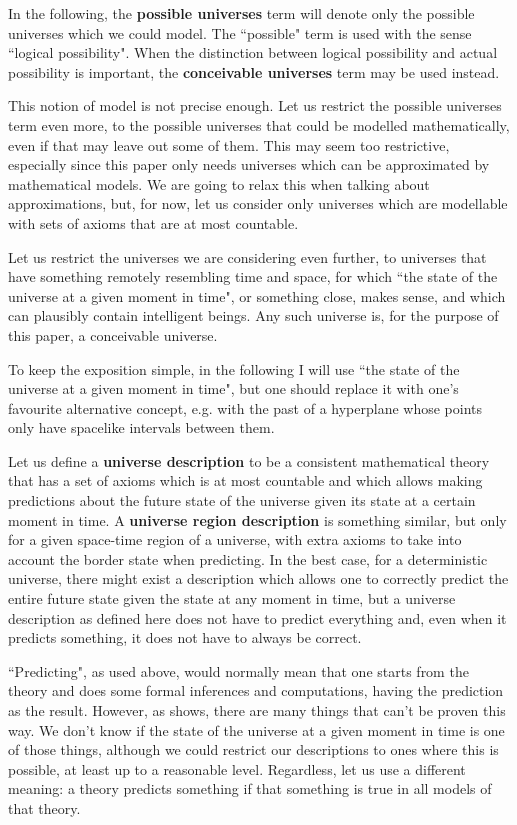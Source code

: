 \documentclass[a4paper
,draft
]{article}
\newcommand{\definitie}[1]{\textbf{#1}}
\newcommand{\ghilimele}[1]{``#1"}
\begin{document}
In the following, the \definitie{possible universes} term will denote
only the possible universes which we could model.
The \ghilimele{possible} term is used with the sense
\ghilimele{logical possibility}. When the distinction between logical
possibility and actual possibility is important, the
\definitie{conceivable universes} term may be used instead.

This notion of model is not precise enough.
Let us restrict the possible universes term even more,
to the possible universes that could be modelled mathematically,
even if that may leave out some of them.
This may seem too restrictive,
especially since this paper only needs universes which can be approximated
by mathematical models.
We are going to relax this when talking about approximations, but, for now,
let us consider only universes
which are modellable with sets of axioms that are at most countable.

Let us restrict the universes we are considering even further, to universes that
have something remotely resembling time and space, for which
\ghilimele{the state of the universe at a given moment in time}, or something
close, makes sense, and which can plausibly contain intelligent beings.
Any such universe is, for the purpose of this paper, a conceivable universe.

To keep the exposition simple, in the following I will use
\ghilimele{the state of the universe at a given moment in time},
but one should replace it with one's favourite alternative concept, e.g.
with the past of a hyperplane whose points only have spacelike intervals between
them.

Let us define a \definitie{universe description} to be a
consistent mathematical theory that has
a set of axioms which is at most countable and which allows making
predictions about the future state of the universe given its state
at a certain moment in time. A \definitie{universe region description}
is something similar, but only for a given space-time region of a universe,
with extra axioms to take into account the border state when predicting.
In the best case, for a deterministic universe, there might exist
a description which allows one to correctly predict the entire future state
given the state at any moment in time, but a universe description
as defined here does not have to predict everything and,
even when it predicts something, it does not have to always be correct.

\ghilimele{Predicting}, as used above, would normally mean that one
starts from the theory and does some formal inferences and computations, having
the prediction as the result.
However, as \cite{Calude2013} shows, there are many
things that can't be proven this way.
We don't know if the state of the universe at a given moment in time is one of
those things, although we could restrict our descriptions to ones where this
is possible, at least up to a reasonable level.
Regardless, let us use a different meaning: a theory predicts something if
that something is true in all models of that theory.
\end{document}
